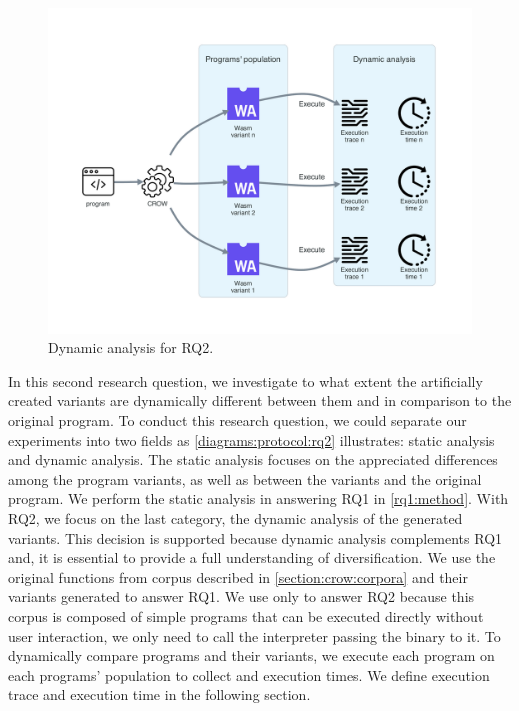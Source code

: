 
\section{\rqtwo}
\label{rq2:method}


\begin{figure}[h]
    \centering
    \includegraphics[width=\linewidth]{diagrams/Rq2.pdf}
    \caption{Dynamic analysis for RQ2.}
    \label{diagrams:protocol:rq2}
\end{figure}

In this second research question, we investigate to what extent the artificially created variants are dynamically different between them and in comparison to the original program. To conduct this research question, we could separate our experiments into two fields as \autoref{diagrams:protocol:rq2} illustrates: static analysis and dynamic analysis. 
The static analysis focuses on the appreciated differences among the program variants, as well as between the variants and the original program. We perform the static analysis in answering RQ1 in \autoref{rq1:method}. 
With RQ2, we focus on the last category, the dynamic analysis of the generated variants. This decision is supported because dynamic analysis complements RQ1 and, it is essential to provide a full understanding of diversification.
We use the original functions from \corpusrosetta corpus described in \autoref{section:crow:corpora} and their variants generated to answer RQ1. 
We use only \corpusrosetta to answer RQ2 because this corpus is composed of simple programs that can be executed directly without user interaction, \ie we only need to call the interpreter passing the \wasm binary to it. 
To dynamically compare programs and their variants, we execute each program on each programs' population to collect and execution times. We define execution trace and execution time in the following section.

